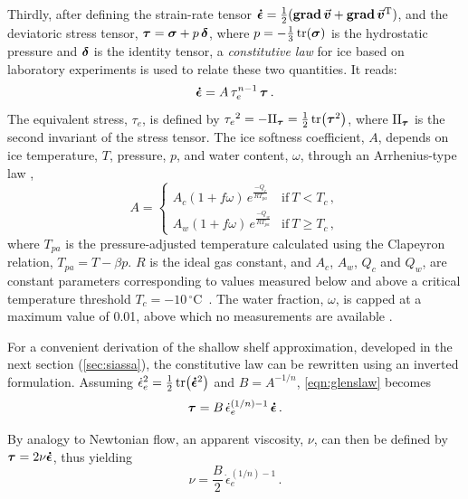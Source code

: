 \documentclass[a4paper]{kappa}
\newcommand{\vect}[1]{\va*{#1}} %
\newcommand{\tens}[1]{\vb*{#1}} %
\newcommand{\tgrad}[1]{\tens{\mathrm{grad}}\,#1}    %
\newcommand{\doteps}[0]{\dot{\epsilon}} %
\newcommand{\IDT}[0]{\tens{\delta}}     %
\newcommand{\CST}[0]{\tens{\sigma}}     %
\newcommand{\DST}[0]{\tens{\tau}}       %
\newcommand{\SRT}[0]{\tens{\doteps}}    %
\newcommand{\vv}[0]{\vect{v}}           %
\newcommand{\unit}[1]{\ensuremath{\mathrm{#1}}}
\newcommand{\degree}[0]{\ensuremath{^{\circ}}}
\newcommand{\degC}[0]{\unit{{\degree}C}}
\begin{document}
Thirdly, after defining the strain-rate tensor
${\SRT = \frac{1}{2}(\tgrad{\vv} + \tgrad{\vv}^{\mathrm{T}})}$,
and the deviatoric stress tensor, ${\DST = \CST + p\,\IDT}$,
where $p=-\frac{1}{3}\tr(\CST)$ is the hydrostatic pressure and
$\tens{\delta}$ is the identity tensor, a \emph{constitutive law} for ice
\citep{Nye.1953} based on laboratory experiments \citep{Glen.1952} is used to
relate these two quantities. It reads:
\begin{equation}
    \label{eqn:glenslaw}
    \SRT = A\,\tau_e^{n-1}\,\DST \,.
\end{equation}
The equivalent stress, $\tau_e$, is defined by
${\tau_e}^2 = -\mathrm{II}_{\DST} = \frac{1}{2} \tr(\DST^2)$,
where $\mathrm{II}_{\DST}$ is the second invariant of the stress tensor.
The ice softness coefficient, $A$, depends on ice temperature, $T$, pressure, $p$, and
water content, $\omega$, through an Arrhenius-type law
\citep[Eqs.~63--65]{Paterson.Budd.1982, Aschwanden.etal.2012},
\begin{equation}
    A =
    \begin{cases}
        A_c (1+f\omega)\,e^\frac{-Q_c}{RT_{pa}}
            & \text{if}\ T < T_c \,, \\
        A_w (1+f\omega)\,e^\frac{-Q_w}{RT_{pa}}
            & \text{if}\ T \ge T_c \,,
    \end{cases}
\end{equation}
where $T_{pa}$ is the pressure-adjusted temperature calculated using the
Clapeyron relation, ${T_{pa} = T - \beta p}$. $R$ is the ideal gas constant,
and $A_c$, $A_w$, $Q_c$ and $Q_w$, are constant parameters corresponding to
values measured below and above a critical temperature threshold
${T_c=-10}$\,\degC\ \citep[\cref{tab:params};][]{Paterson.Budd.1982}.
The water fraction, $\omega$, is capped at a maximum value of 0.01, above which
no measurements are available \citep[Eq.~5.7]{Lliboutry.Duval.1985,
Greve.1997}.

For a convenient derivation of the shallow shelf approximation, developed in
the next section (\cref{sec:siassa}), the constitutive law can be rewritten
using an inverted formulation. Assuming
${{\doteps_e}^2 = \frac{1}{2} \tr(\SRT^2)}$ and ${B=A^{-1/n}}$,
\cref{eqn:glenslaw} becomes
\begin{equation}
    \label{eqn:invglenslaw}
    \DST = B\,\doteps_e^{(1/n)-1}\,\SRT \,.
\end{equation}

By analogy to Newtonian flow, an apparent viscosity, $\nu$, can then be defined
by ${\DST = 2 \nu\SRT}$, thus yielding
\begin{equation}
    \label{eqn:viscosity}
    \nu = \frac{B}{2}\,\doteps_e^{(1/n)-1} \,.
\end{equation}
\end{document}
